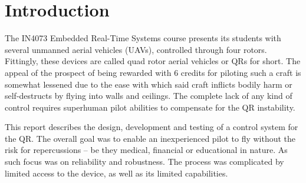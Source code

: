 \documentclass[11pt]{article}
\title{\vspace*{-1cm}{\bf IN4073 Technical Report 2011-2012}}
\author{	\textbf{Team G} \\
			E. Caruso (4204395) \\
			H.N. Dantas (4172922) \\
			M. Neumann (1267264)}
\date{April 2012}
\begin{document}
\maketitle

\begin{abstract}
For the ERTS course was necessary to design, develop and test a control system for a quad rotor (QR). The controller should be able to stabilize the vehicle and respond to the pilot commands.
 
A protocol was invented by the team to address the communication needs of this project. Close attention was paid to the strict bandwidth constraints and exigent reliability requirements.

In order to control the vehicle, it was equipped with an accelerometer, a gyroscope and a FPGA.
Due to high noise on the sensor readings two filters were implemented, Butterworth and Kalman. The former used for yaw control, and the latter for pitch and roll stabilization.

Telemetry data is displayed on the PC in real-time. Additionally, a log file with extensive information is kept during flight and sent to the PC upon request.

During demonstration the controller proved to be very fast and accurate, with latencies in the order of $\mu$-seconds which resulted in a quasi-static behavior of the quad rotor, as desired.
 
\end{abstract}

\section{Introduction}
The IN4073 Embedded Real-Time Systems course presents its students with several unmanned aerial vehicles (UAVs), controlled through four rotors. Fittingly, these devices are called quad rotor aerial vehicles or QRs for short. The appeal of the prospect of being rewarded with 6 credits for piloting such a craft is somewhat lessened due to the ease with which said craft inflicts bodily harm or self-destructs by flying into walls and ceilings. The complete lack of any kind of control requires superhuman pilot abilities to compensate for the QR instability.

This report describes the design, development and testing of a control system for the QR. The overall goal was to enable an inexperienced pilot to fly without the risk for repercussions -- be they medical, financial or educational in nature. As such focus was on reliability and robustness. The process was complicated by limited access to the device, as well as its limited capabilities.
\end{document}
